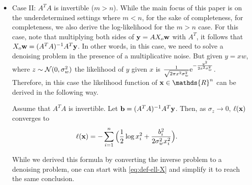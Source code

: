 \documentclass[onecolumn]{IEEEtran}
\newcommand{\wv}{{\bf w}}
\begin{document}
\begin{itemize}





\item{Case II: $A^TA$ is  invertible ($m>n$).}\label{sec:denoising}
While the main focus of this paper is on the underdetermined settings where $m<n$, for the sake of completeness, for completeness, we also derive the log-likelihood for the $m>n$ case. For this case,  note that multiplying  both sides of $\yv=AX_o\wv$ with $A^T$, it follows that $X_o\wv=(A^TA)^{-1}A^T\yv$. In other words, in this case, we need to solve a denoising problem in the presence of a multiplicative noise.  But given $y=xw$, where $z\sim\mathcal{N}(0,\sigma_w^2)$ the likelihood of $y$ given $x$ is ${1\over \sqrt{2\pi x^2\sigma_w^2}}{\rm e}^{-{y^2\over 2x^2\sigma_w^2}}$. Therefore, in this case the likelihood function of $\xv\in\mathds{R}^n$ can be derived in the following way. 

 \begin{theorem}\label{thm:At-A-invert}
Assume that $A^TA$ is invertible. Let ${\bf b}=(A^TA)^{-1}A^T{\bf y}$. Then, as $\sigma_z\to 0$, $\ell({\bf x})$ converges to
\begin{align}
\ell({\bf x})&=-\sum_{i=1}^n\Big( {1\over 2}\log x_i^2+{b_i^2\over 2\sigma_w^2 x_i^2}\Big).
\end{align}
\end{theorem}
While we derived this formula by converting the inverse problem to a denoising problem, one can start with \eqref{eq:def-ell-X} and simplify it to reach the same conclusion. 


\end{itemize}

%
%
\end{document}

